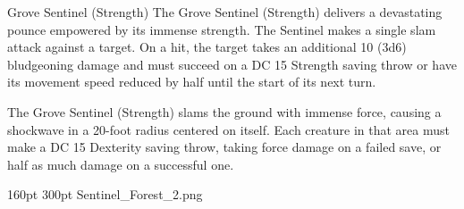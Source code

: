 \begin{DndMonster}[width=0.5\textwidth +0.5em]{Grove Sentinel (Strength)}
    The Grove Sentinel (Strength) delivers a devastating pounce empowered by its immense strength. The Sentinel makes a single slam attack against a target. On a hit, the target takes an additional 10 (3d6) bludgeoning damage and must succeed on a DC 15 Strength saving throw or have its movement speed reduced by half until the start of its next turn.
    
	The Grove Sentinel (Strength) slams the ground with immense force, causing a shockwave in a 20-foot radius centered on itself. Each creature in that area must make a DC 15 Dexterity saving throw, taking  force damage on a failed save, or half as much damage on a successful one.
      
\end{DndMonster}

%
%

\def\primarycolor{titlered}%
\def\secondarycolor{white}%
\MonsterBannerGraphic%
	{}%
	{160pt}%
	{300pt}%
	{Sentinel_Forest_2.png}%
	{}%
%


